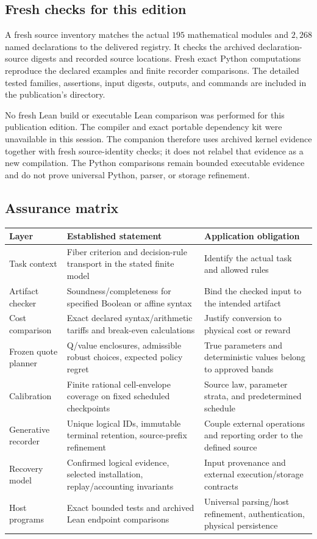 \subsection{Fresh checks for this edition}
A fresh source inventory matches the actual $195$ mathematical modules and $2{,}268$ named declarations to the delivered registry. It checks the archived declaration-source digests and recorded source locations. Fresh exact Python computations reproduce the declared examples and finite recorder comparisons. The detailed tested families, assertions, input digests, outputs, and commands are included in the publication's  directory.

No fresh Lean build or executable Lean comparison was performed for this publication edition. The compiler and exact portable dependency kit were unavailable in this session. The companion therefore uses archived kernel evidence together with fresh source-identity checks; it does not relabel that evidence as a new compilation. The Python comparisons remain bounded executable evidence and do not prove universal Python, parser, or storage refinement.

\subsection{Assurance matrix}
\begin{longtable}{p{.24\linewidth}p{.37\linewidth}p{.30\linewidth}}
\toprule
Layer & Established statement & Application obligation \\
\midrule\endhead
Task context & Fiber criterion and decision-rule transport in the stated finite model & Identify the actual task and allowed rules \\
Artifact checker & Soundness/completeness for specified Boolean or affine syntax & Bind the checked input to the intended artifact \\
Cost comparison & Exact declared syntax/arithmetic tariffs and break-even calculations & Justify conversion to physical cost or reward \\
Frozen quote planner & Q/value enclosures, admissible robust choices, expected policy regret & True parameters and deterministic values belong to approved bands \\
Calibration & Finite rational cell-envelope coverage on fixed scheduled checkpoints & Source law, parameter strata, and predetermined schedule \\
Generative recorder & Unique logical IDs, immutable terminal retention, source-prefix refinement & Couple external operations and reporting order to the defined source \\
Recovery model & Confirmed logical evidence, selected installation, replay/accounting invariants & Input provenance and external execution/storage contracts \\
Host programs & Exact bounded tests and archived Lean endpoint comparisons & Universal parsing/host refinement, authentication, physical persistence \\
\bottomrule
\end{longtable}

